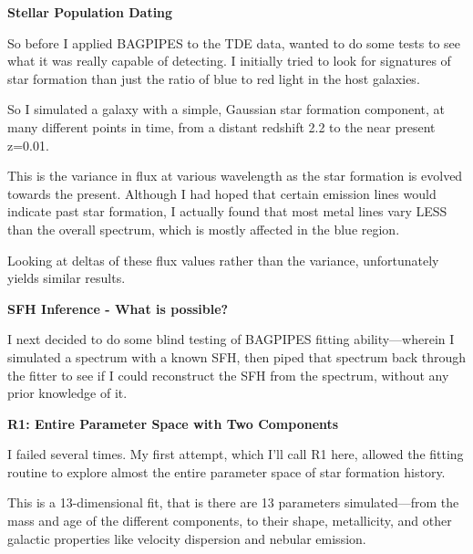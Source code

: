 \documentclass[a4paper,11pt]{article}
\begin{document}
\noindent \newline \textbf{Stellar Population Dating}

\noindent \newline So before I applied BAGPIPES to the TDE data, wanted to do some tests to see
what it was really capable of detecting. I initially tried to look for signatures
of star formation than just the ratio of blue to red light in the host galaxies.

\noindent \newline \textbf{}

\noindent \newline So I simulated a galaxy with a simple, Gaussian star formation component, at
many different points in time, from a distant redshift 2.2 to the near present
z=0.01.

\noindent \newline This is the variance in flux at various wavelength as the star formation is
evolved towards the present. Although I had hoped that certain emission lines
would indicate past star formation, I actually found that most metal lines vary
LESS than the overall spectrum, which is mostly affected in the blue region.

\noindent \newline \textbf{}

\noindent \newline Looking at deltas of these flux values rather than the variance, unfortunately
yields similar results.

\noindent \newline \textbf{SFH Inference - What is possible?}

\noindent \newline I next decided to do some blind testing of BAGPIPES fitting ability---wherein
I simulated a spectrum with a known SFH, then piped that spectrum back through
the fitter to see if I could reconstruct the SFH from the spectrum, without any
prior knowledge of it.


\noindent \newline \textbf{R1: Entire Parameter Space with Two Components}

\noindent \newline I failed several times. My first attempt, which I'll call R1 here, allowed the
fitting routine to explore almost the entire parameter space of star formation
history.

\noindent \newline This is a 13-dimensional fit, that is there are 13 parameters simulated---from
the mass and age of the different components, to their shape, metallicity, and
other galactic properties like velocity dispersion and nebular emission.
\end{document}
